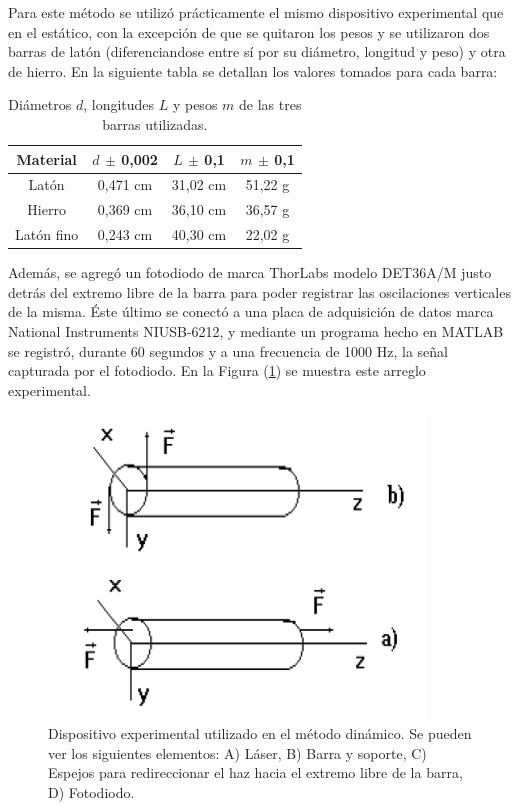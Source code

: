 \documentclass[twoside,twocolumn,a4paper]{article}
\begin{document}
Para este m\'etodo se utiliz\'o pr\'acticamente el mismo dispositivo experimental que en el est\'atico, con la excepci\'on de que se quitaron los pesos y se utilizaron dos barras de lat\'on (diferenciandose entre s\'i por su di\'ametro, longitud y peso) y otra de hierro. En la siguiente tabla se detallan los valores tomados para cada barra:\newline

\begin{table}[H]
\centering
\caption{Di\'ametros $d$, longitudes $L$ y pesos $m$ de las tres barras utilizadas.}
\label{tab:valoresbarras}
\begin{tabular}{|c|c|c|c|}
\hline
Material & $d$ $\pm$ 0,002 & $L$ $\pm$ 0,1 & $m$ $\pm$ 0,1\\ \hline
Lat\'on & 0,471 cm & 31,02 cm & 51,22 g\\ \hline
Hierro & 0,369 cm & 36,10 cm & 36,57 g  \\ \hline
Lat\'on fino & 0,243 cm & 40,30 cm & 22,02 g \\ \hline
\end{tabular}
\end{table}


Adem\'as, se agreg\'o un fotodiodo de  marca ThorLabs modelo DET36A/M justo detr\'as del extremo libre de la barra para poder registrar las oscilaciones verticales de la misma. \newline
\'Este \'ultimo se conect\'o a una placa de adquisici\'on de datos marca National Instruments NIUSB-6212, y mediante un programa hecho en MATLAB se registr\'o, durante 60 segundos y a una frecuencia de 1000 Hz, la se\~nal capturada por el fotodiodo. En la Figura (\ref{fig:dispexp_dinamico}) se muestra este arreglo experimental.

\begin{figure}[H]
\includegraphics[width=\linewidth]{momentos.jpg}
\caption{Dispositivo experimental utilizado en el m\'etodo din\'amico. Se pueden ver los siguientes elementos: A) L\'aser, B) Barra y soporte, C) Espejos para redireccionar el haz hacia el extremo libre de la barra, D) Fotodiodo.}
\label{fig:dispexp_dinamico}
\end{figure}
\end{document}
